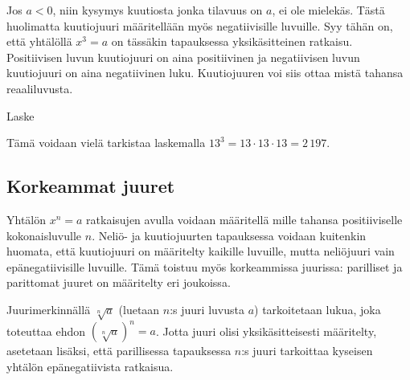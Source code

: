 
Jos $a<0$, niin kysymys kuutiosta jonka tilavuus on $a$, ei ole mielekäs. Tästä huolimatta kuutiojuuri määritellään myös negatiivisille luvuille. Syy tähän on, että yhtälöllä $x^3=a$ on tässäkin tapauksessa yksikäsitteinen ratkaisu. Positiivisen luvun kuutiojuuri on aina positiivinen ja negatiivisen luvun kuutiojuuri on aina negatiivinen luku. Kuutiojuuren voi siis ottaa mistä tahansa reaaliluvusta.


\begin{esimerkki}
Laske

\begin{esimratk}
Tämä voidaan vielä tarkistaa laskemalla $13^3 = 13\cdot 13\cdot 13=2\,197$.
\end{esimratk}

\begin{esimvast}
\end{esimvast}
\end{esimerkki}

\subsection*{Korkeammat juuret}

Yhtälön $x^n=a$ ratkaisujen avulla voidaan määritellä  mille tahansa positiiviselle kokonaisluvulle $n$. Neliö- ja kuutiojuurten tapauksessa voidaan kuitenkin huomata, että kuutiojuuri on määritelty kaikille luvuille, mutta neliöjuuri vain epänegatiivisille luvuille. Tämä toistuu myös korkeammissa juurissa: parilliset ja parittomat juuret on määritelty eri joukoissa.

Juurimerkinnällä $\sqrt[n]{a}$ (luetaan $n$:s juuri luvusta $a$) tarkoitetaan lukua, joka toteuttaa ehdon $(\sqrt[n]{a})^n = a$. Jotta juuri olisi yksikäsitteisesti määritelty, asetetaan lisäksi, että parillisessa tapauksessa $n$:s juuri tarkoittaa kyseisen yhtälön epänegatiivista ratkaisua.


